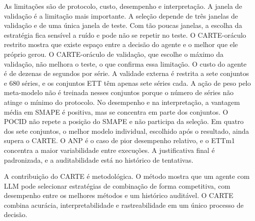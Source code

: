 As limitações são de protocolo, custo, desempenho e interpretação. A janela de validação é a limitação mais importante. A seleção depende de três janelas de validação e de uma única janela de teste. Com tão poucas janelas, a escolha da estratégia fica sensível a ruído e pode não se repetir no teste. O CARTE-oráculo restrito mostra que existe espaço entre a decisão do agente e o melhor que ele próprio gerou. O CARTE-oráculo de validação, que escolhe o máximo da validação, não melhora o teste, o que confirma essa limitação. O custo do agente é de dezenas de segundos por série. A validade externa é restrita a sete conjuntos e 680 séries, e os conjuntos ETT têm apenas sete séries cada. A ação de peso pelo meta-modelo não é treinada nesses conjuntos porque o número de séries não atinge o mínimo do protocolo. No desempenho e na interpretação, a vantagem média em SMAPE é positiva, mas se concentra em parte dos conjuntos. O POCID não repete a posição do SMAPE e não participa da seleção. Em quatro dos sete conjuntos, o melhor modelo individual, escolhido após o resultado, ainda supera o CARTE. O ANP é o caso de pior desempenho relativo, e o ETTm1 concentra a maior variabilidade entre execuções. A justificativa final é padronizada, e a auditabilidade está no histórico de tentativas.

A contribuição do CARTE é metodológica. O método mostra que um agente com LLM pode selecionar estratégias de combinação de forma competitiva, com desempenho entre os melhores métodos e um histórico auditável. O CARTE combina acurácia, interpretabilidade e rastreabilidade em um único processo de decisão.
